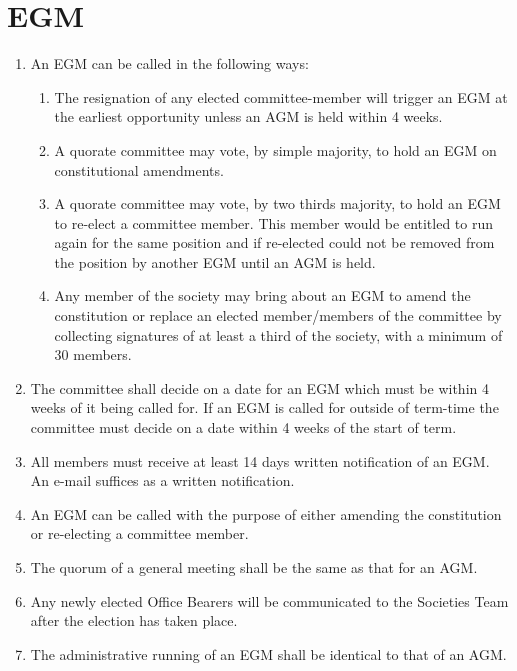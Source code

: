 \section{EGM}

\begin{enumerate}
\item An EGM can be called in the following ways:
  \begin{enumerate}
  \item The resignation of any elected committee-member will trigger an EGM at the earliest opportunity unless an AGM is held within 4 weeks.
  \item A quorate committee may vote, by simple majority, to hold an EGM on constitutional amendments.
  \item A quorate committee may vote, by two thirds majority, to hold an EGM to re-elect a committee member. This member would be entitled to run again for the same position and if re-elected could not be removed from the position by another EGM until an AGM is held.
  \item Any member of the society may bring about an EGM to amend the constitution or replace an elected member/members of the committee by collecting signatures of at least a third of the society, with a minimum of 30 members.
  \end{enumerate}

\item The committee shall decide on a date for an EGM which must be within 4 weeks of it being called for. If an EGM is called for outside of term-time the committee must decide on a date within 4 weeks of the start of term.

\item All members must receive at least 14 days written notification of an EGM\@. An e-mail suffices as a written notification.

\item An EGM can be called with the purpose of either amending the constitution or re-electing a committee member.

\item The quorum of a general meeting shall be the same as that for an AGM\@.

\item Any newly elected Office Bearers will be communicated to the Societies Team after the election has taken place.

\item The administrative running of an EGM shall be identical to that of an AGM\@.

\end{enumerate}
